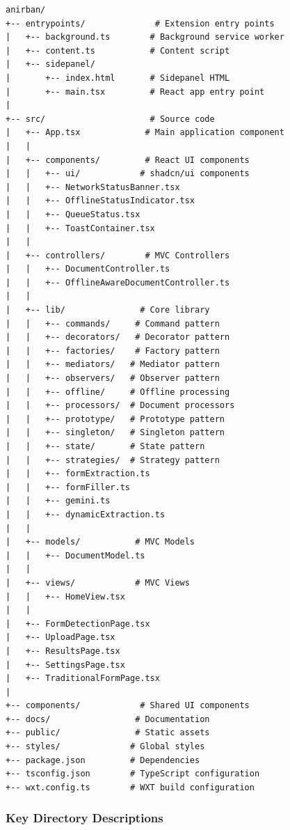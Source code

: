 \documentclass[11pt, a4paper]{article}
\theoremstyle{plain}
\theoremstyle{definition}
\begin{document}
\begin{verbatim}
anirban/
+-- entrypoints/              # Extension entry points
|   +-- background.ts        # Background service worker
|   +-- content.ts           # Content script
|   +-- sidepanel/
|       +-- index.html       # Sidepanel HTML
|       +-- main.tsx         # React app entry point
|
+-- src/                     # Source code
|   +-- App.tsx             # Main application component
|   |
|   +-- components/         # React UI components
|   |   +-- ui/            # shadcn/ui components
|   |   +-- NetworkStatusBanner.tsx
|   |   +-- OfflineStatusIndicator.tsx
|   |   +-- QueueStatus.tsx
|   |   +-- ToastContainer.tsx
|   |
|   +-- controllers/        # MVC Controllers
|   |   +-- DocumentController.ts
|   |   +-- OfflineAwareDocumentController.ts
|   |
|   +-- lib/               # Core library
|   |   +-- commands/     # Command pattern
|   |   +-- decorators/   # Decorator pattern
|   |   +-- factories/    # Factory pattern
|   |   +-- mediators/   # Mediator pattern
|   |   +-- observers/   # Observer pattern
|   |   +-- offline/     # Offline processing
|   |   +-- processors/  # Document processors
|   |   +-- prototype/   # Prototype pattern
|   |   +-- singleton/   # Singleton pattern
|   |   +-- state/       # State pattern
|   |   +-- strategies/  # Strategy pattern
|   |   +-- formExtraction.ts
|   |   +-- formFiller.ts
|   |   +-- gemini.ts
|   |   +-- dynamicExtraction.ts
|   |
|   +-- models/           # MVC Models
|   |   +-- DocumentModel.ts
|   |
|   +-- views/            # MVC Views
|   |   +-- HomeView.tsx
|   |
|   +-- FormDetectionPage.tsx
|   +-- UploadPage.tsx
|   +-- ResultsPage.tsx
|   +-- SettingsPage.tsx
|   +-- TraditionalFormPage.tsx
|
+-- components/            # Shared UI components
+-- docs/                 # Documentation
+-- public/               # Static assets
+-- styles/              # Global styles
+-- package.json         # Dependencies
+-- tsconfig.json        # TypeScript configuration
+-- wxt.config.ts        # WXT build configuration
\end{verbatim}

\subsubsection{Key Directory Descriptions}
\end{document}
